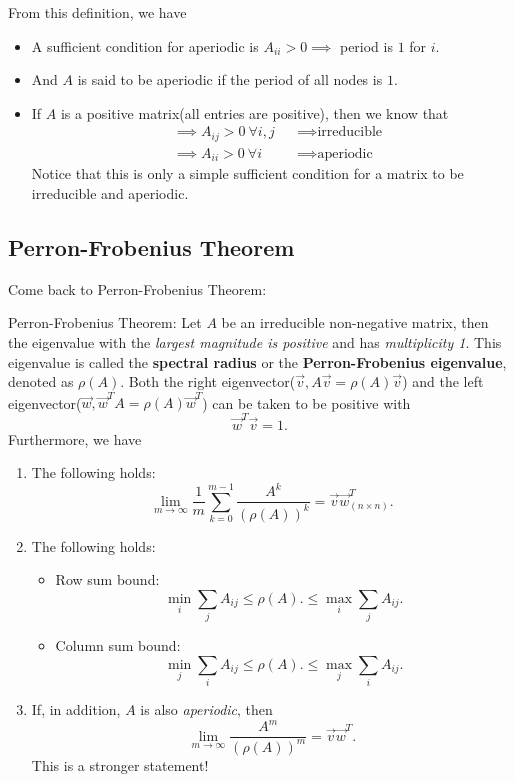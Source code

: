 \begin{remark}
	From this definition, we have
	\begin{itemize}
		\item A sufficient condition for aperiodic is \(A_{ii} > 0 \implies \) period is \(1\) for \(i\).
		\item And \(A\) is said to be aperiodic if the period of all nodes is \(1\).
		\item If \(A\) is a positive matrix(all entries are positive), then we know that
		      \[
			      \begin{alignedat}{3}
				      &\implies A_{ij}>0\ \forall i, j &&\implies \text{irreducible}\\
				      &\implies A_{ii}>0\ \forall i &&\implies \text{aperiodic}
			      \end{alignedat}
		      \]
		      Notice that this is only a simple sufficient condition for a matrix to be irreducible and aperiodic.
	\end{itemize}
\end{remark}

\subsection{Perron-Frobenius Theorem}
Come back to Perron-Frobenius Theorem:
\begin{theorem}
	\label{Perron-Frobenius Theorem}
	Perron-Frobenius Theorem: Let \(A\) be an irreducible non-negative matrix, then the eigenvalue with the \emph{largest magnitude is positive}
	and has \emph{multiplicity 1}. This eigenvalue is called the \textbf{spectral radius} or the \textbf{Perron-Frobenius eigenvalue},
	denoted as \(\rho(A)\).
	Both the right eigenvector(\(\vec{v}, A \vec{v} = \rho(A) \vec{v}\)) and the left eigenvector(\(\vec{w}, \vec{w}^{T}A = \rho(A) \vec{w}^{T}\))
	can be taken to be positive with
	\[
		\vec{w}^{T} \vec{v} = 1.
	\]
	Furthermore, we have
	\begin{enumerate}
		\item The following holds:
		      \[
			      \lim_{m \to \infty} \frac{1}{m} \sum\limits_{k=0}^{m-1} \frac{A^k}{(\rho(A))^k} = \vec{v} \vec{w}^{T}_{(n\times n)}.
		      \]
		\item The following holds:
		      \begin{itemize}
			      \item Row sum bound:
			            \[
				            \min_i \sum\limits_{j} A_{ij} \leq \rho(A).\leq \max_i \sum\limits_{j} A_{ij}.
			            \]
			      \item Column sum bound:
			            \[
				            \min_j \sum\limits_{i} A_{ij} \leq \rho(A).\leq \max_j \sum\limits_{i} A_{ij}.
			            \]
		      \end{itemize}
		\item If, in addition, \(A\) is also \emph{aperiodic}, then
		      \[
			      \lim_{m \to \infty} \frac{A^m}{(\rho(A))^m} = \vec{v} \vec{w}^{T}.
		      \]
		      This is a stronger statement!
	\end{enumerate}
\end{theorem}

